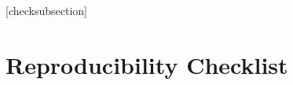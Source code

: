\documentclass[letterpaper]{article}
\begin{document}
\fi

\setlength{\leftmargini}{20pt}

\makeatletter\def\@listi{\leftmargin\leftmargini \topsep .5em \parsep .5em \itemsep .5em}

\def\@listii{\leftmargin\leftmarginii \labelwidth\leftmarginii \advance\labelwidth-\labelsep \topsep .4em \parsep .4em \itemsep .4em}

\def\@listiii{\leftmargin\leftmarginiii \labelwidth\leftmarginiii \advance\labelwidth-\labelsep \topsep .4em \parsep .4em \itemsep .4em}\makeatother



\setcounter{secnumdepth}{0}

\renewcommand\thesubsection{\arabic{subsection}}

\renewcommand\labelenumi{\thesubsection.\arabic{enumi}}




[checksubsection]



\newcommand{\checksubsection}[1]{%

  \refstepcounter{checksubsection}%

  \paragraph{\arabic{checksubsection}. #1}%

  \setcounter{checkitem}{0}%

}



\newcommand{\checkitem}{%

  \refstepcounter{checkitem}%

  \item[\arabic{checksubsection}.\arabic{checkitem}.]%

}

\newcommand{\question}[2]{\normalcolor\checkitem #1 #2 \color{blue}}

\newcommand{\ifyespoints}[1]{\makebox[0pt][l]{\hspace{-15pt}\normalcolor #1}}



\section*{Reproducibility Checklist}
\end{document}
